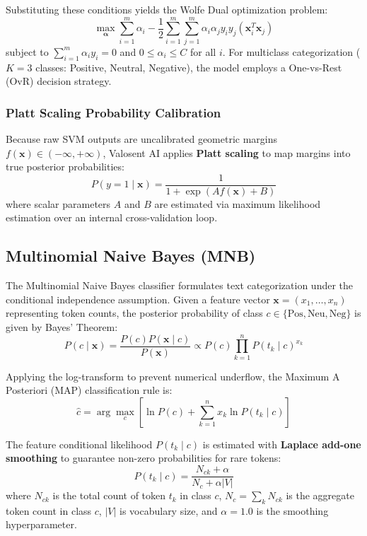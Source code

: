 Substituting these conditions yields the Wolfe Dual optimization problem:
\begin{equation}
    \max_{\bm{\alpha}} \sum_{i=1}^m \alpha_i - \frac{1}{2} \sum_{i=1}^m \sum_{j=1}^m \alpha_i \alpha_j y_i y_j (\mathbf{x}_i^T \mathbf{x}_j)
    \label{eq:svm_dual}
\end{equation}
subject to $\sum_{i=1}^m \alpha_i y_i = 0$ and $0 \le \alpha_i \le C$ for all $i$. For multiclass categorization ($K = 3$ classes: Positive, Neutral, Negative), the model employs a One-vs-Rest (OvR) decision strategy.

\subsubsection{Platt Scaling Probability Calibration}
Because raw SVM outputs are uncalibrated geometric margins $f(\mathbf{x}) \in (-\infty, +\infty)$, Valosent AI applies \textbf{Platt scaling} to map margins into true posterior probabilities:
\begin{equation}
    P(y = 1 \mid \mathbf{x}) = \frac{1}{1 + \exp(A f(\mathbf{x}) + B)}
    \label{eq:platt_scaling}
\end{equation}
where scalar parameters $A$ and $B$ are estimated via maximum likelihood estimation over an internal cross-validation loop.

\subsection{Multinomial Naive Bayes (MNB)}
The Multinomial Naive Bayes classifier formulates text categorization under the conditional independence assumption. Given a feature vector $\mathbf{x} = (x_1, \dots, x_n)$ representing token counts, the posterior probability of class $c \in \{\text{Pos}, \text{Neu}, \text{Neg}\}$ is given by Bayes' Theorem:
\begin{equation}
    P(c \mid \mathbf{x}) = \frac{P(c) P(\mathbf{x} \mid c)}{P(\mathbf{x})} \propto P(c) \prod_{k=1}^n P(t_k \mid c)^{x_k}
    \label{eq:mnb_bayes}
\end{equation}

Applying the log-transform to prevent numerical underflow, the Maximum A Posteriori (MAP) classification rule is:
\begin{equation}
    \hat{c} = \arg\max_{c} \left[ \ln P(c) + \sum_{k=1}^n x_k \ln P(t_k \mid c) \right]
    \label{eq:mnb_map}
\end{equation}

The feature conditional likelihood $P(t_k \mid c)$ is estimated with \textbf{Laplace add-one smoothing} to guarantee non-zero probabilities for rare tokens:
\begin{equation}
    P(t_k \mid c) = \frac{N_{ck} + \alpha}{N_c + \alpha |V|}
    \label{eq:laplace_smoothing}
\end{equation}
where $N_{ck}$ is the total count of token $t_k$ in class $c$, $N_c = \sum_k N_{ck}$ is the aggregate token count in class $c$, $|V|$ is vocabulary size, and $\alpha = 1.0$ is the smoothing hyperparameter.

